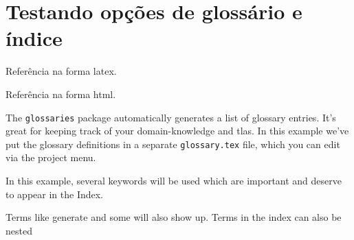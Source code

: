 \chapter{Testando opções de glossário e índice}
Referência na forma \gls{latex}.

Referência na forma \gls{html}.

The \texttt{glossaries} package automatically generates a list of glossary entries. It's great for keeping track of your \gls{domain-knowledge} and \glspl{tla}. In this example we've put the glossary definitions in a separate \texttt{glossary.tex} file, which you can edit via the project menu.

In this example, several keywords will be used 
which are important and deserve to appear in the Index.

Terms like generate and some will also 
show up. Terms in the index can also be nested 